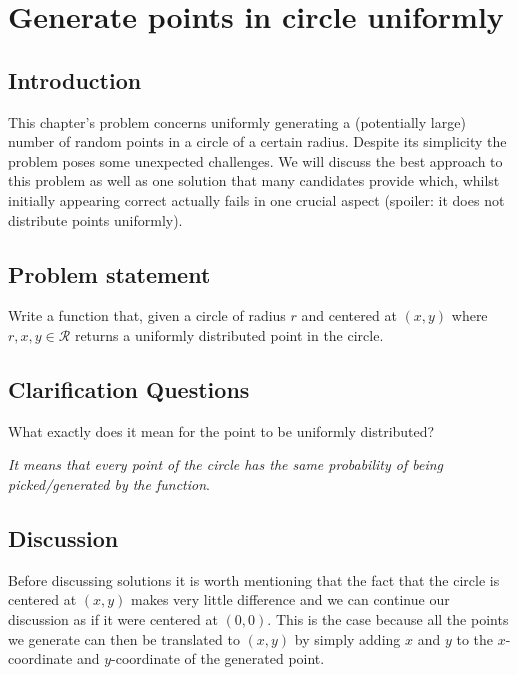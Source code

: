 %

\chapter{Generate points in circle uniformly}
\label{ch:random_points_in_circle}
\section*{Introduction}
This chapter's problem concerns uniformly generating a (potentially large) number of random points in a circle of a certain radius. Despite its simplicity the problem poses some unexpected challenges. We will discuss the best approach to this problem as well as one solution that many candidates provide which, whilst initially appearing correct actually fails in one crucial aspect (spoiler: it does not distribute points uniformly). 

\section{Problem statement}
\begin{exercise}
Write a function that, given a circle of radius $r$ and centered at $(x,y)$ where $r,x,y \in \mathcal{R}$ returns a uniformly distributed point in the circle.
\end{exercise}


\section{Clarification Questions}

\begin{QandA}
	\item \begin{questionitem} \begin{question} What exactly does it mean for the point to be uniformly distributed?  \end{question} 	 
    \begin{answered}
		\textit{It means that every point of the circle has the same probability of being picked/generated by the function}.
	\end{answered} \end{questionitem}
\end{QandA}

\section{Discussion}
\label{random_points_in_circle:sec:discussion}
Before discussing solutions it is worth mentioning that the fact that the circle is centered at $(x,y)$ makes very little difference and we can continue our discussion as if it were centered at $(0,0)$. This is the case because all the points we generate can then be translated to $(x,y)$ by simply adding $x$ and $y$ to the $x$-coordinate and $y$-coordinate of the generated point.

